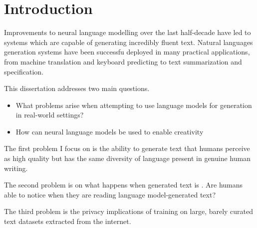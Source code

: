 \chapter{Introduction} \label{chap:intro}

Improvements to neural language modelling over the last half-decade have led to systems which are capable of generating incredibly fluent text.
Natural languages generation systems have been successfu deployed in many practical applications, from machine translation and keyboard predicting to text summarization and specification.

This dissertation addresses two main questions.

\begin{itemize}
\item{What problems arise when attempting to use language models for generation in real-world settings?}
\item{How can neural language models be used to enable creativity}
\end{itemize}

The first problem I focus on is the ability to generate text that humans perceive as high quality but has the same diversity of language present in genuine human writing.

The second problem is on what happens when generated text is \TODO{}. Are humans able to notice when they are reading language model-generated text?

The third problem is the privacy implications of training on large, barely curated text datasets extracted from the internet.  




